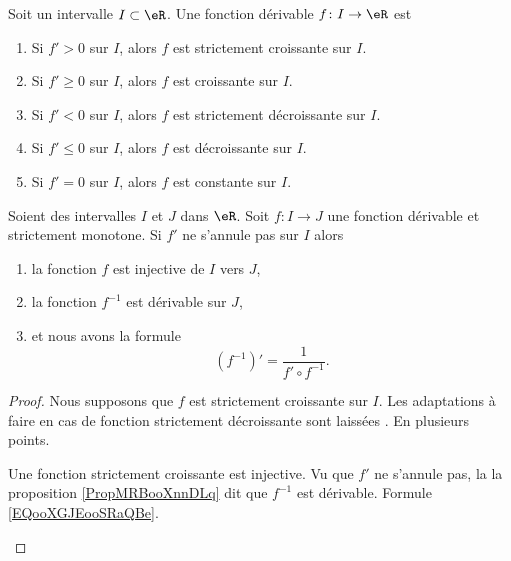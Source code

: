 \begin{proposition}      \label{PROPooKZPZooWjIsWg}
	Soit un intervalle \( I\subset \eR\).  Une fonction dérivable \( f\colon I\to \eR\) est
	\begin{enumerate}
		\item
		      Si \( f'>0\) sur \( I\), alors \( f\) est strictement croissante sur \( I\).
		\item		\label{ITEMooKMDXooPBnVoi}
		      Si \( f'\geq 0\) sur \( I\), alors \( f\) est croissante sur \( I\).
		\item
		      Si \( f'<0\) sur \( I\), alors \( f\) est strictement décroissante sur \( I\).
		\item
		      Si \( f'\leq 0\) sur \( I\), alors \( f\) est décroissante sur \( I\).
		\item		\label{ITEMooYCDQooFvFyEH}
		      Si \( f'=0\)  sur \( I\), alors \( f\) est constante sur \( I\).
	\end{enumerate}
\end{proposition}

\begin{proposition}      \label{PROPooSGTBooFxUuXK}
	Soient des intervalles \( I\) et \( J\) dans \( \eR\).  Soit \(f \colon I\to J \) une fonction dérivable et strictement monotone. Si \( f'\)  ne s'annule pas sur \( I\) alors
	\begin{enumerate}
		\item       \label{ITEMooFXHYooRNHYPI}
		      la fonction \( f\) est injective de \( I\) vers \( J\),
		\item       \label{ITEMooWPPIooDUAYsH}
		      la fonction \( f^{-1}\) est dérivable sur \( J\),
		\item       \label{ITEMooTVMLooQgjLEB}
		      et nous avons la formule
		      \begin{equation}        \label{EQooELIHooDxUFxH}
			      (f^{-1})'=\frac{1}{ f'\circ f^{-1} }.
		      \end{equation}
	\end{enumerate}
\end{proposition}

\begin{proof}
	Nous supposons que \( f\) est strictement croissante sur \( I\). Les adaptations à faire en cas de fonction strictement décroissante sont laissées . En plusieurs points.
	\begin{subproof}
		Une fonction strictement croissante est injective.
		Vu que \( f'\) ne s'annule pas, la la proposition \ref{PropMRBooXnnDLq} dit que \( f^{-1}\) est dérivable.
		Formule \ref{EQooXGJEooSRaQBe}.
	\end{subproof}
\end{proof}

